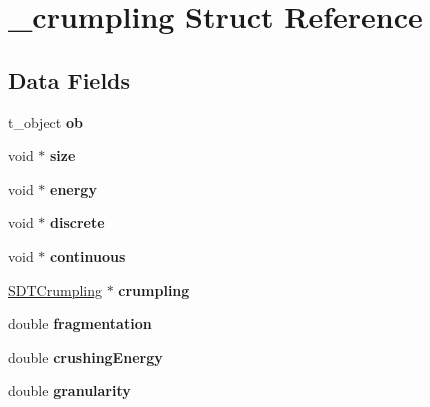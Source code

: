 \hypertarget{struct__crumpling}{}\section{\+\_\+crumpling Struct Reference}
\label{struct__crumpling}
\subsection*{Data Fields}
\begin{DoxyCompactItemize}
\item 
\hypertarget{struct__crumpling_ad34f9fd398b3cedd4ebcb1633ccba77b}{}t\+\_\+object {\bfseries ob}\label{struct__crumpling_ad34f9fd398b3cedd4ebcb1633ccba77b}

\item 
\hypertarget{struct__crumpling_a307cc44943b04b5dea69fc2cd5110d84}{}void $\ast$ {\bfseries size}\label{struct__crumpling_a307cc44943b04b5dea69fc2cd5110d84}

\item 
\hypertarget{struct__crumpling_a461cb95f7c344aea53ac8e09fed6c193}{}void $\ast$ {\bfseries energy}\label{struct__crumpling_a461cb95f7c344aea53ac8e09fed6c193}

\item 
\hypertarget{struct__crumpling_a36b4125be48bf6a0c00f7e3545c88f8a}{}void $\ast$ {\bfseries discrete}\label{struct__crumpling_a36b4125be48bf6a0c00f7e3545c88f8a}

\item 
\hypertarget{struct__crumpling_aa826edd0194ff7e91d21de4d0c2c19e3}{}void $\ast$ {\bfseries continuous}\label{struct__crumpling_aa826edd0194ff7e91d21de4d0c2c19e3}

\item 
\hypertarget{struct__crumpling_adf15b83f4502fb7dadf6f87a4b7a055b}{}\hyperlink{struct_s_d_t_crumpling}{S\+D\+T\+Crumpling} $\ast$ {\bfseries crumpling}\label{struct__crumpling_adf15b83f4502fb7dadf6f87a4b7a055b}

\item 
\hypertarget{struct__crumpling_aed6775749daef6f8f92f61a8d4c8926d}{}double {\bfseries fragmentation}\label{struct__crumpling_aed6775749daef6f8f92f61a8d4c8926d}

\item 
\hypertarget{struct__crumpling_ae441d9802546d10266b7b369f289a125}{}double {\bfseries crushing\+Energy}\label{struct__crumpling_ae441d9802546d10266b7b369f289a125}

\item 
\hypertarget{struct__crumpling_a5249a363398fde6b2e5b4be3c329ed06}{}double {\bfseries granularity}\label{struct__crumpling_a5249a363398fde6b2e5b4be3c329ed06}


\end{DoxyCompactItemize}
